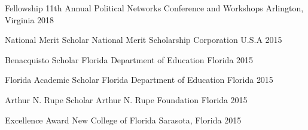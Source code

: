 

\begin{cvhonors}

  \cvhonor
    {Fellowship} %
    {11th Annual Political Networks Conference and Workshops} %
    {Arlington, Virginia} %
    {2018} %

  \cvhonor
    {National Merit Scholar} %
    {National Merit Scholarship Corporation} %
    {U.S.A} %
    {2015} %

  \cvhonor
    {Benacquisto Scholar} %
    {Florida Department of Education} %
    {Florida} %
    {2015} %

  \cvhonor
    {Florida Academic Scholar} %
    {Florida Department of Education} %
    {Florida} %
    {2015} %

  \cvhonor
    {Arthur N. Rupe Scholar} %
    {Arthur N. Rupe Foundation} %
    {Florida} %
    {2015} %

  \cvhonor
    {Excellence Award} %
    {New College of Florida} %
    {Sarasota, Florida} %
    {2015} %


\end{cvhonors}
